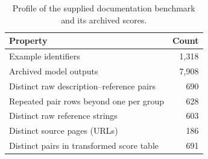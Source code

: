 \begin{table}[H]
\centering\small
\caption{Profile of the supplied documentation benchmark and its archived scores.}
\label{tab:data}
\begin{tabular}{@{}lr@{}}
\toprule
Property & Count\\
\midrule
Example identifiers & 1,318\\
Archived model outputs & 7,908\\
Distinct raw description--reference pairs & 690\\
Repeated pair rows beyond one per group & 628\\
Distinct raw reference strings & 603\\
Distinct source pages (URLs) & 186\\
Distinct pairs in transformed score table & 691\\
\bottomrule
\end{tabular}
\par\vspace{0.3em}{\footnotesize Raw pair grouping uses exact Description and Code fields in the documentation table. The separately transformed score table has a different pair count.}
\end{table}
